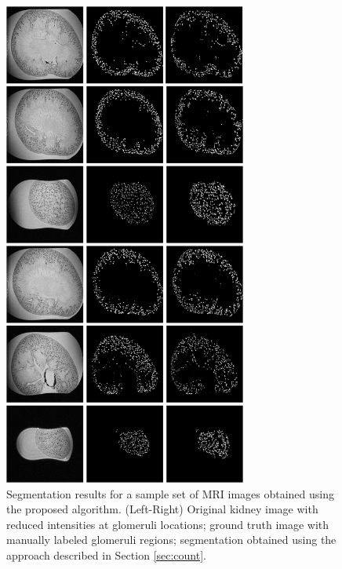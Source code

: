 \begin{figure}[t]
\begin{minipage}[b]{1.0\linewidth}
  \centering
  \includegraphics[width=8cm]{results.png}
\end{minipage}
\caption{Segmentation results for a sample set of MRI images obtained using the proposed algorithm. (Left-Right) Original kidney image with reduced intensities at glomeruli locations; ground truth image with manually labeled glomeruli regions; segmentation obtained using the approach described in Section \ref{sec:count}.}
\label{Fig:res}
\end{figure}

